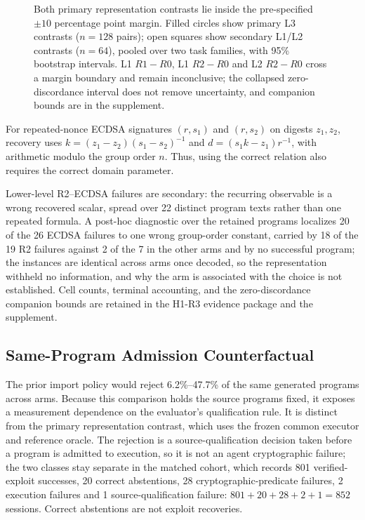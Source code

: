 \begin{figure}[t]
\centering

\caption{Both primary representation contrasts lie inside the pre-specified $\pm10$ percentage point margin. Filled circles show primary L3 contrasts ($n=128$ pairs); open squares show secondary L1/L2 contrasts ($n=64$), pooled over two task families, with 95\% bootstrap intervals. L1 $R1-R0$, L1 $R2-R0$ and L2 $R2-R0$ cross a margin boundary and remain inconclusive; the collapsed zero-discordance interval does not remove uncertainty, and companion bounds are in the supplement.}\label{fig:primary-effects}
\end{figure}

For repeated-nonce ECDSA signatures $(r,s_1)$ and $(r,s_2)$ on digests
$z_1,z_2$, recovery uses $k=(z_1-z_2)(s_1-s_2)^{-1}$ and
$d=(s_1k-z_1)r^{-1}$, with arithmetic modulo the group order $n$.
Thus, using the correct relation also requires the correct domain parameter.

\begin{samepage}
Lower-level R2--ECDSA failures are secondary:
the recurring observable is a wrong recovered scalar, spread over 22 distinct
program texts rather than one repeated formula. A post-hoc diagnostic over the
retained programs localizes 20 of the 26 ECDSA failures to one wrong
group-order constant, carried by 18 of the 19 R2 failures against 2 of the 7
in the other arms and by no successful program; the instances are identical
across arms once decoded, so the representation withheld no information, and
why the arm is associated with the choice is not established. Cell counts,
terminal accounting, and the zero-discordance companion bounds are retained in
the H1-R3 evidence package and the supplement.
\end{samepage}

\subsection{Same-Program Admission Counterfactual}\label{sec:policy-counterfactual}
The prior import policy would
reject 6.2\%--47.7\% of the same generated programs across arms. Because
this comparison holds the source programs fixed, it exposes a measurement
dependence on the evaluator's qualification rule. It is distinct from the
primary representation contrast, which uses the frozen common executor and
reference oracle. The rejection is a source-qualification decision taken
before a program is admitted to execution, so it is not an agent
cryptographic failure; the two classes stay separate in the matched cohort,
which records 801 verified-exploit successes, 20 correct abstentions,
28 cryptographic-predicate failures, 2 execution failures and
1 source-qualification failure: $801+20+28+2+1=852$ sessions.
Correct abstentions are not exploit recoveries.

